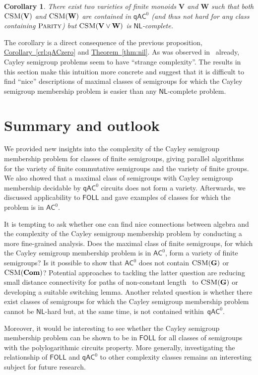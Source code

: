 \documentclass[11pt]{article}
\numberwithin{equation}{section}
\newtheorem{corollary}[theorem]{Corollary}
\theoremstyle{definition}
\theoremstyle{plain}
\newcommand{\expref}[2]{\hyperref[#2]{#1~\ref{#2}}}
\newcommand{\FOLL}{\ensuremath{\mathsf{FOLL}}}
\newcommand{\AC}{\ensuremath{\mathsf{AC}}}
\newcommand{\qAC}{\ensuremath{\mathsf{qAC}}}
\newcommand{\NL}{\ensuremath{\mathsf{NL}}}
\newcommand{\vV}{\mathbf{V}}
\newcommand{\vW}{\mathbf{W}}
\newcommand{\vCom}{\mathbf{Com}}
\newcommand{\vG}{\mathbf{G}}
\newcommand{\CSM}{\ensuremath{\textsc{CSM}}}
\newcommand{\Parity}{\ensuremath{\textsc{Parity}}}
\newcommand{\SCSM}{Cayley semigroup membership}
\newcommand{\SCSMP}{{\SCSM} problem}
\newcommand{\SPLCP}{polylogarithmic circuits property}
\begin{document}
\begin{corollary}
  There exist two varieties of finite monoids $\vV$ and $\vW$ such that both
  $\CSM(\vV)$ and $\CSM(\vW)$ are contained in $\qAC^0$ (and thus not hard 
for any class containing $\Parity$) but $\CSM(\vV \lor \vW)$ is $\NL$-complete.
\end{corollary}

The corollary is a direct consequence of the previous proposition,
\expref{Corollary}{crl:qACzero} and \expref{Theorem}{thm:nil}.
%
As was observed in~\cite{BarringtonKLM01} already, Cayley semigroup problems
seem to have ``strange complexity''.
%
The results in this section make this intuition more concrete and suggest that
it is difficult to find ``nice'' descriptions of maximal classes of semigroups
for which the {\SCSMP} is easier than any $\NL$-complete problem.

\section{Summary and outlook}

We provided new insights into the complexity of the {\SCSMP} for classes of
finite semigroups, giving parallel algorithms for the variety of finite
commutative semigroups and the variety of finite groups. We also showed that a
maximal class of semigroups with {\SCSM} decidable by $\qAC^0$ circuits does
not form a variety. Afterwards, we discussed applicability to $\FOLL$ and
gave examples of classes for which the problem is in $\AC^0$.

It is tempting to ask whether one can find nice connections between algebra and
the complexity of the {\SCSMP} by conducting a more fine-grained analysis.
%
Does the maximal class of finite semigroups, for which the {\SCSMP} is in
$\AC^0$, form a variety of finite semigroups?
%
Is it possible to show that $\AC^0$ does not contain $\CSM(\vG)$ or
$\CSM(\vCom)$?
%
Potential approaches to tackling the latter question are reducing small
distance connectivity for paths of non-constant length~\cite{ChenOSRT16} to
$\CSM(\vG)$ or developing a suitable switching lemma.
%
Another related question is whether there exist classes of semigroups for which
the {\SCSMP} cannot be $\NL$-hard but, at the same time, is not contained
within~$\qAC^0$.

Moreover, it would be interesting to see whether the {\SCSMP} can be shown to
be in $\FOLL$ for all classes of semigroups with the {\SPLCP}.
%
More generally, investigating the relationship of $\FOLL$ and $\qAC^0$ to other
complexity classes remains an interesting subject for future research.
\end{document}

